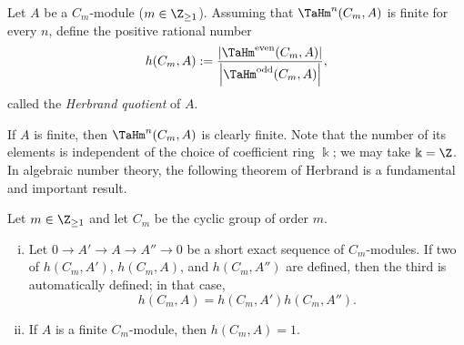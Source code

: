 \begin{definition}
	Let $A$ be a $C_m$-module ($m\in\Z_{\geq1}$). Assuming that
	$\TaHm^n(C_m,A)$ is finite for every $n$, define the positive rational
	number
	\[ h(C_m, A) := \frac{\left|\TaHm^{\text{even}}(C_m, A)\right|}{\left|\TaHm^{\text{odd}}(C_m, A)\right|}, \]
	called the \emph{Herbrand quotient} of $A$.
\end{definition}

If $A$ is finite, then $\TaHm^n(C_m,A)$ is clearly finite. Note that the
number of its elements is independent of the choice of coefficient ring
$\Bbbk$; we may take $\Bbbk=\Z$. In algebraic number theory, the following
theorem of Herbrand is a fundamental and important result.

\begin{theorem}[J.\ Herbrand]
	Let $m\in\Z_{\geq1}$ and let $C_m$ be the cyclic group of order $m$.
	\begin{enumerate}[(i)]
		\item Let $0\to A'\to A\to A''\to0$ be a short exact sequence of
		$C_m$-modules. If two of $h(C_m,A')$, $h(C_m,A)$, and
		$h(C_m,A'')$ are defined, then the third is automatically defined; in
		that case,
		\[ h(C_m, A) = h(C_m, A') h(C_m, A''). \]
		\item If $A$ is a finite $C_m$-module, then $h(C_m,A)=1$.
	\end{enumerate}
\end{theorem}

